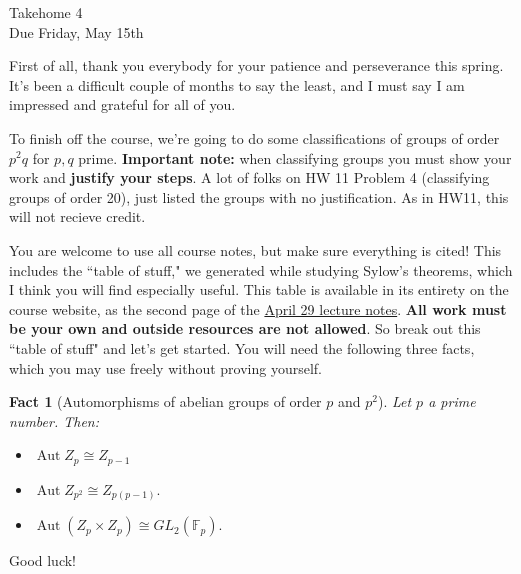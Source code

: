 \documentclass[11pt]{article}
\newtheorem*{facts}{Fact}
\newcommand{\Aut}{\operatorname{Aut}}
\newcommand{\bF}{\mathbb{F}}
\begin{document}
\begin{center}
\Large {Takehome 4}\\
\small {Due Friday, May 15th}
\end{center}
First of all, thank you everybody for your patience and perseverance this spring.  It's been a difficult couple of months to say the least, and I must say I am impressed and grateful for all of you.

To finish off the course, we're going to do some classifications of groups of order $p^2q$ for $p,q$ prime.  \textbf{Important note:} when classifying groups you must show your work and \textbf{justify your steps}.  A lot of folks on HW 11 Problem 4 (classifying groups of order 20), just listed the groups with no justification.  As in HW11, this will not recieve credit.

You are welcome to use all course notes, but make sure everything is cited!  This includes the ``table of stuff," we generated while studying Sylow's theorems, which I think you will find especially useful.  This table is available in its entirety on the course website, as the second page of the \href{http://www.gabrieldorfsmanhopkins.com/m113sp20/April29.pdf}{April 29 lecture notes}.  \textbf{All work must be your own and outside resources are not allowed}.  So break out this ``table of stuff" and let's get started.  You will need the following three facts, which you may use freely without proving yourself.
\begin{facts}[Automorphisms of abelian groups of order $p$ and $p^2$]
  Let $p$ a prime number.  Then:
  \begin{itemize}
    \item{
    $\Aut Z_p\cong Z_{p-1}$
    }
    \item{
    $\Aut Z_{p^2}\cong Z_{p(p-1)}.$
    }
    \item{
    $\Aut\left(Z_p\times Z_p\right)\cong GL_2(\bF_p).$
    }
  \end{itemize}
\end{facts}
Good luck!
\end{document}
